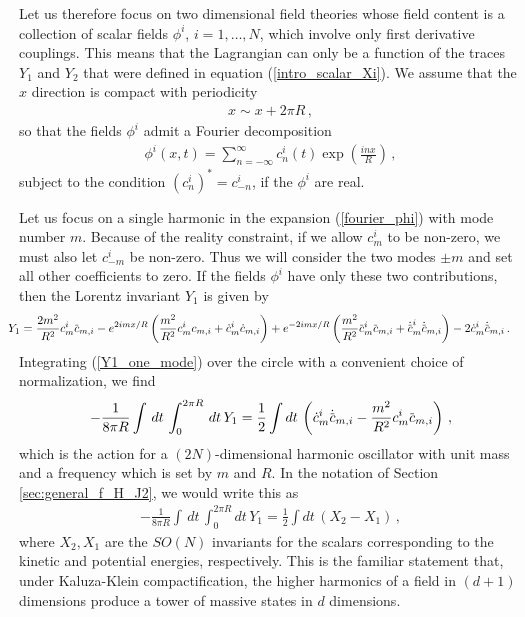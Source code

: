 \documentclass[12pt]{article}
\numberwithin{equation}{section}
\newcommand{\overbar}[1]{\mkern 1.5mu\overline{\mkern-1.5mu#1\mkern-1.5mu}\mkern 1.5mu}
\def\cbar{{\overbar{c}}}
\begin{document}
Let us therefore focus on two dimensional field theories whose field content is a collection of scalar fields $\phi^i$, $i = 1 , \ldots , N$, which involve only first derivative couplings. This means that the Lagrangian can only be a function of the traces $Y_1$ and $Y_2$ that were defined in equation (\ref{intro_scalar_Xi}). We assume that the $x$ direction is compact with periodicity
%
\begin{align}
    x \sim x + 2 \pi R \, , 
\end{align}
%
so that the fields $\phi^i$ admit a Fourier decomposition
%
\begin{align}\label{fourier_phi}
    \phi^i ( x, t ) = \sum_{n = - \infty}^{\infty} c^i_n ( t ) \exp \left( \frac{i n x}{R} \right) \, ,
\end{align}
%
subject to the condition $\left( c_n^i \right)^\ast = c_{-n}^i$, if the $\phi^i$ are real.

Let us focus on a single harmonic in the expansion (\ref{fourier_phi}) with mode number $m$. Because of the reality constraint, if we allow $c_m^i$ to be non-zero, we must also let $c_{-m}^i$ be non-zero. Thus we will consider the two modes $\pm m$ and set all other coefficients to zero. If the fields $\phi^i$ have only these two contributions, then the Lorentz invariant $Y_1$ is given by
%
\begin{align}\label{Y1_one_mode}\hspace{-10pt}
    Y_1 &= \frac{2 m^2}{R^2} c_m^i \cbar_{m, i} - e^{2 i m x / R} \left( \frac{m^2}{R^2} c_m^i c_{m, i} + \dot{c}_m^i \dot{c}_{m, i} \right)  + e^{-2 i m x / R} \left( \frac{m^2}{R^2} \cbar_m^i \cbar_{m, i} + \dot{\cbar}_m^i \dot{\cbar}_{m, i} \right) - 2 \dot{c}_m^i \dot{\cbar}_{m, i} \, .
\end{align}
%
Integrating (\ref{Y1_one_mode}) over the circle with a convenient choice of normalization, we find
%
\begin{align}
    - \frac{1}{8 \pi R} \int \, dt \, \int_{0}^{2 \pi R} \, dt \, Y_1 = \frac{1}{2} \int dt \, \left( \dot{c}_m^i \dot{\cbar}_{m, i} - \frac{m^2}{R^2} c_m^i \cbar_{m, i} \right) \, , 
\end{align}
%
which is the action for a $(2N)$-dimensional harmonic oscillator with unit mass and a frequency which is set by $m$ and $R$. In the notation of Section \ref{sec:general_f_H_J2}, we would write this as
%
\begin{align}
    - \frac{1}{8 \pi R} \int \, dt \, \int_{0}^{2 \pi R} dt \, Y_1 = \frac{1}{2} \int dt \, \left( X_2 - X_1 \right) \, , 
\end{align}
%
where $X_2, X_1$ are the $SO(N)$ invariants for the scalars corresponding to the kinetic and potential energies, respectively. This is the familiar statement that, under Kaluza-Klein compactification, the higher harmonics of a field in $(d+1)$ dimensions produce a tower of massive states in $d$ dimensions.
\end{document}
